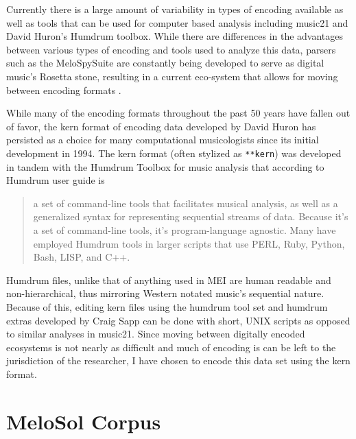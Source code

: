 \documentclass[12pt,]{book}
\begin{document}
Currently there is a large amount of variability in types of encoding available as well as tools that can be used for computer based analysis including music21 \citep{cuthbertMusic21ToolkitComputerAided2010} and David Huron's Humdrum \citep{huronHumdrumToolkitReference1994} toolbox.
While there are differences in the advantages between various types of encoding and tools used to analyze this data, parsers such as the MeloSpySuite are constantly being developed to serve as digital music's Rosetta stone, resulting in a current eco-system that allows for moving between encoding formats \citep{frielerIntroducingJazzomatProject2013}.

While many of the encoding formats throughout the past 50 years have fallen out of favor, the kern format of encoding data developed by David Huron has persisted as a choice for many computational musicologists since its initial development in 1994.
The kern format (often stylized as \texttt{**kern}) was developed in tandem with the Humdrum Toolbox for music analysis that according to Humdrum user guide \citep{huronHumdrumToolkitReference1994} is

\begin{quote}
a set of command-line tools that facilitates musical analysis, as well as a generalized syntax for representing sequential streams of data. Because it's a set of command-line tools, it's program-language agnostic. Many have employed Humdrum tools in larger scripts that use PERL, Ruby, Python, Bash, LISP, and C++.
\end{quote}

Humdrum files, unlike that of anything used in MEI are human readable and non-hierarchical, thus mirroring Western notated music's sequential nature.
Because of this, editing kern files using the humdrum tool set and humdrum extras developed by Craig Sapp \citep{sappHumdrumExtras2008} can be done with short, UNIX scripts as opposed to similar analyses in music21.
Since moving between digitally encoded ecosystems is not nearly as difficult and much of encoding is can be left to the jurisdiction of the researcher, I have chosen to encode this data set using the kern format.

\hypertarget{melosol-corpus}{%
\section{MeloSol Corpus}\label{melosol-corpus}}
\end{document}

